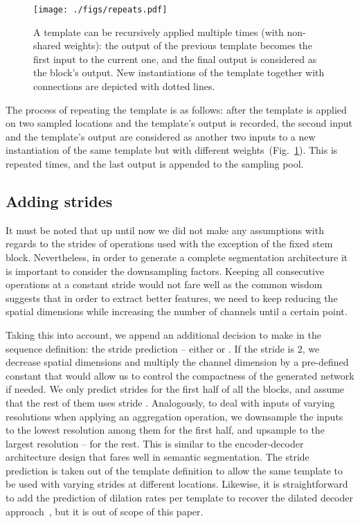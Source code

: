 \documentclass[10pt,twocolumn,letterpaper]{article}
\begin{document}
\begin{figure}[t]
	\begin{center}
		\texttt{[image: ./figs/repeats.pdf]}
	\end{center}
	\caption{A template can be recursively applied multiple times (with non-shared weights): the output of the previous template becomes the first input to the current one, and the final output is considered as the block's output. New instantiations of the template together with connections are depicted with dotted lines. 
		\label{fig:repeats}}
\end{figure}

The process of repeating the template is as follows: after the template is applied on two sampled locations and the template's output is recorded, the second input and the template's output are considered as another two inputs to a new instantiation of the same template but with different weights~(Fig.~\ref{fig:repeats}). This is repeated  times, and the last output is appended to the sampling pool.

\subsection{Adding strides}
\label{strides}

It must be noted that up until now we did not make any assumptions with regards to the strides of operations used with the exception of the fixed stem block. Nevertheless, in order to generate a complete segmentation architecture it is important to consider the downsampling factors. Keeping all consecutive operations at a constant stride would not fare well as the common wisdom suggests that in order to extract better features, we need to keep reducing the spatial dimensions while increasing the number of channels until a certain point.

Taking this into account, we append an additional decision to make in the sequence definition: the stride prediction -- either  or . If the stride is 2, we decrease spatial dimensions and multiply the channel dimension by a pre-defined constant that would allow us to control the compactness of the generated network if needed. We only predict strides for the first half of all the blocks, and assume that the rest of them uses stride . Analogously, to deal with inputs of varying resolutions when applying an aggregation operation, we downsample the inputs to the lowest resolution among them for the first half, and upsample to the largest resolution -- for the rest. This is similar to the encoder-decoder architecture design that fares well in semantic segmentation.
The stride prediction is taken out of the template definition to allow the same template to be used with varying strides at different locations. Likewise, it is straightforward to add the prediction of dilation rates per template to recover the dilated decoder approach~\cite{ChenPKMY18}, but it is out of scope of this paper.
\end{document}
